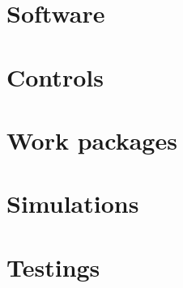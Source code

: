 \documentclass{democlass}
\begin{document}
\chapter{Software}
 \cleardoublepage
\chapter{Controls}
 \cleardoublepage
\chapter{Work packages}
 \cleardoublepage
\chapter{Simulations}
 \cleardoublepage
\chapter{Testings}
 \cleardoublepage

\thispagestyle{empty}
 \cleardoublepage

\end{document}
